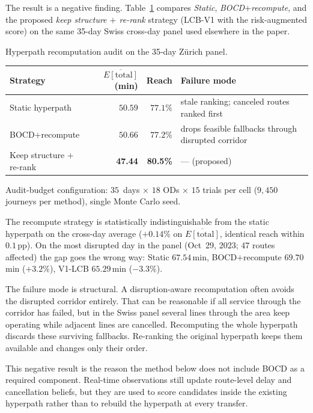 \documentclass[opre,dblanonrev]{informs4}
\begin{document}
The result is a negative finding. Table~\ref{tab:recompute_audit}
compares \emph{Static}, \emph{BOCD$+$recompute}, and the proposed
\emph{keep structure $+$ re-rank} strategy (LCB-V1 with the
risk-augmented score) on the
same 35-day Swiss cross-day panel used elsewhere in the paper.

\begin{table}
\TABLE
{Hyperpath recomputation audit on the 35-day Z\"urich panel.\label{tab:recompute_audit}}
{\begin{tabular}{lrrl}
\toprule
Strategy & $\overline{E[\mathrm{total}]}$ (min) & Reach & Failure mode \\
\midrule
Static hyperpath           & $50.59$ & $77.1\%$ & stale ranking; canceled routes ranked first \\
BOCD$+$recompute           & $50.66$ & $77.2\%$ & drops feasible fallbacks through disrupted corridor \\
Keep structure $+$ re-rank & \textbf{47.44} & \textbf{80.5\%} & --- (proposed) \\
\bottomrule
\end{tabular}}
{Audit-budget configuration: $35$~days $\times$ $18$ ODs
$\times$ $15$ trials per cell ($9{,}450$ journeys per method), single
Monte Carlo seed.}
\end{table}

\noindent
The recompute strategy is statistically indistinguishable from
the static hyperpath on the cross-day average ($+0.14\%$ on
$\overline{E[\mathrm{total}]}$, identical reach within $0.1$\,pp).
On the most disrupted day in the panel (Oct~29, 2023; $47$ routes
affected) the gap goes the wrong way: Static $67.54$\,min,
BOCD$+$recompute $69.70$\,min ($+3.2\%$), V1-LCB $65.29$\,min
($-3.3\%$).

The failure mode is structural. A disruption-aware recomputation
often avoids the disrupted corridor entirely. That can be reasonable
if all service through the corridor has failed, but in the Swiss
panel several lines through the area keep operating while adjacent
lines are cancelled. Recomputing the whole hyperpath discards these
surviving fallbacks. Re-ranking the original hyperpath keeps them
available and changes only their order.

This negative result is the reason the method below does not include
BOCD as a required component. Real-time observations still update
route-level delay and cancellation beliefs, but they are used to
score candidates inside the existing hyperpath rather than to rebuild
the hyperpath at every transfer.
\end{document}

